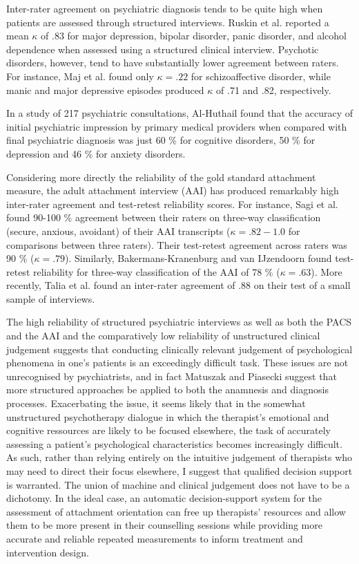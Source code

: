\documentclass[12pt]{report}
\begin{document}
Inter-rater agreement on psychiatric diagnosis tends to be quite high when patients are assessed through structured interviews. Ruskin et al. \cite{Ruskin1998} reported a mean $\kappa$ of .83 for major depression, bipolar disorder, panic disorder, and alcohol dependence when assessed using a structured clinical interview.
Psychotic disorders, however, tend to have substantially lower agreement between raters. For instance, Maj et al. \cite{Maj2000} found only $\kappa = .22$ for schizoaffective disorder, while manic and major depressive episodes produced $\kappa$ of .71 and .82, respectively.

In a study of 217 psychiatric consultations, Al-Huthail \cite{Al-Huthail2008} found that the accuracy of initial psychiatric impression by primary medical providers when compared with final psychiatric diagnosis was just 60 \% for cognitive disorders, 50 \% for depression and 46 \% for anxiety disorders.

Considering more directly the reliability of the gold standard attachment measure, the adult attachment interview (AAI) has produced remarkably high inter-rater agreement and test-retest reliability scores.
For instance, Sagi et al. \cite{Sagi1994} found 90-100 \% agreement between their raters on three-way classification (secure, anxious, avoidant) of their AAI transcripts ($\kappa = .82 - 1.0$ for comparisons between three raters). Their test-retest agreement across raters was 90 \% ($\kappa = .79$).
Similarly, Bakermans-Kranenburg and van IJzendoorn \cite{BakermansKranenburg1993} found test-retest reliability for three-way classification of the AAI of 78 \% ($\kappa = .63$).
More recently, Talia et al. \cite{Talia2020} found an inter-rater agreement of .88 on their test of a small sample of interviews.

The high reliability of structured psychiatric interviews as well as both the PACS and the AAI and the comparatively low reliability of unstructured clinical judgement suggests that conducting clinically relevant judgement of psychological phenomena in one's patients is an exceedingly difficult task.
These issues are not unrecognised by psychiatrists, and in fact Matuszak and Piasecki \cite{Matuszak2012} suggest that more structured approaches be applied to both the anamnesis and diagnosis processes.
Exacerbating the issue, it seems likely that in the somewhat unstructured psychotherapy dialogue in which the therapist's emotional and cognitive ressources are likely to be focused elsewhere, the task of accurately assessing a patient's psychological characteristics becomes increasingly difficult.
As such, rather than relying entirely on the intuitive judgement of therapists who may need to direct their focus elsewhere, I suggest that qualified decision support is warranted.
The union of machine and clinical judgement does not have to be a dichotomy.
In the ideal case, an automatic decision-support system for the assessment of attachment orientation can free up therapists' resources and allow them to be more present in their counselling sessions while providing more accurate and reliable repeated measurements to inform treatment and intervention design.
\end{document}
